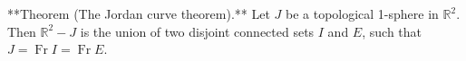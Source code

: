 **Theorem (The Jordan curve theorem).** Let $J$ be a topological 1-sphere in $\mathbb{R}^2$. Then $\mathbb{R}^2 - J$ is the union of two disjoint connected sets $I$ and $E$, such that $J = \operatorname{Fr} I = \operatorname{Fr} E$.
